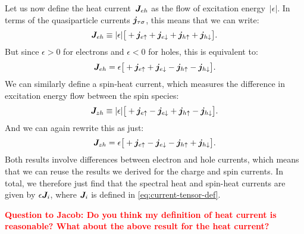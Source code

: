 Let us now define the heat current~$\bm{J}_{eh}$ as the flow of excitation energy~$|\epsilon|$.
In terms of the quasiparticle currents $\bm{j}_{\tau\sigma}$, this means that we can write:
\begin{equation}
  \bm{J}_{eh} \equiv |\epsilon| \big[ +\bm{j}_{e\uparrow} + \bm{j}_{e\downarrow} + \bm{j}_{h\uparrow} + \bm{j}_{h\downarrow} \big].
\end{equation}
But since $\epsilon > 0$ for electrons and $\epsilon < 0$ for holes, this is equivalent to:
\begin{equation}
  \bm{J}_{eh} = \epsilon \big[ +\bm{j}_{e\uparrow} + \bm{j}_{e\downarrow} - \bm{j}_{h\uparrow} - \bm{j}_{h\downarrow} \big].
\end{equation}
We can similarly define a spin-heat current, which measures the difference in excitation energy flow between the spin species:
\begin{equation}
  \bm{J}_{zh} \equiv |\epsilon| \big[ +\bm{j}_{e\uparrow} - \bm{j}_{e\downarrow} + \bm{j}_{h\uparrow} - \bm{j}_{h\downarrow} \big].
\end{equation}
And we can again rewrite this as just:
\begin{equation}
  \bm{J}_{zh} = \epsilon \big[ +\bm{j}_{e\uparrow} - \bm{j}_{e\downarrow} - \bm{j}_{h\uparrow} + \bm{j}_{h\downarrow} \big].
\end{equation}
Both results involve differences between electron and hole currents, which means that we can reuse the results we derived for the charge and spin currents.
In total, we therefore just find that the spectral heat and spin-heat currents are given by $\epsilon\bm{J}_i$, where $\bm{J}_i$ is defined in \cref{eq:current-tensor-def}.

\textbf{\textcolor{red}{Question to Jacob: Do you think my definition of heat current is reasonable? What about the above result for the heat current?}}



